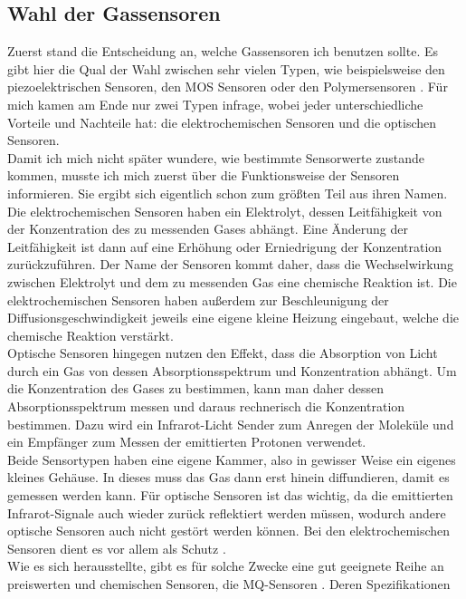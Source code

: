 \documentclass[10pt]{article}
\begin{document}
\subsection{Wahl der Gassensoren}
Zuerst stand die Entscheidung an, welche Gassensoren ich benutzen sollte. Es gibt hier die Qual der Wahl zwischen sehr vielen Typen,
wie beispielsweise den piezoelektrischen Sensoren, den MOS Sensoren oder den Polymersensoren \autocite{SensorTypes}.
Für mich kamen am Ende nur zwei Typen infrage, wobei jeder unterschiedliche Vorteile und Nachteile hat: 
die elektrochemischen Sensoren und die optischen Sensoren.\\
Damit ich mich nicht später wundere, wie bestimmte Sensorwerte zustande kommen, musste ich mich zuerst über
die Funktionsweise der Sensoren informieren. Sie ergibt sich eigentlich schon zum größten Teil aus ihren Namen. Die elektrochemischen Sensoren 
haben ein Elektrolyt, dessen Leitfähigkeit von der Konzentration des zu messenden Gases abhängt. Eine Änderung
der Leitfähigkeit ist dann auf eine Erhöhung oder Erniedrigung der Konzentration zurückzuführen. Der Name der Sensoren kommt daher,
dass die Wechselwirkung zwischen Elektrolyt und dem zu messenden Gas eine chemische Reaktion ist. Die elektrochemischen Sensoren 
haben außerdem zur Beschleunigung der Diffusionsgeschwindigkeit jeweils eine eigene kleine Heizung eingebaut, welche die chemische Reaktion verstärkt.\\
Optische Sensoren hingegen nutzen den Effekt, dass die Absorption von Licht durch ein Gas von dessen Absorptionsspektrum und Konzentration abhängt. 
Um die Konzentration des Gases zu bestimmen, kann man daher dessen Absorptionsspektrum messen und daraus rechnerisch die Konzentration bestimmen.
Dazu wird ein Infrarot-Licht Sender zum Anregen der Moleküle und ein Empfänger zum Messen der emittierten Protonen verwendet.\\
Beide Sensortypen haben eine eigene Kammer, also in gewisser Weise ein eigenes kleines Gehäuse. In dieses muss das Gas dann erst hinein
diffundieren, damit es gemessen werden kann. Für optische Sensoren ist das wichtig, da die emittierten Infrarot-Signale auch wieder zurück reflektiert werden müssen,
wodurch andere optische Sensoren auch nicht gestört werden können. Bei den elektrochemischen Sensoren dient es vor allem als Schutz \autocite{SensorTypes}.\\
Wie es sich herausstellte, gibt es für solche Zwecke eine gut geeignete Reihe an preiswerten und chemischen Sensoren, die MQ-Sensoren \autocite{MQSensoren}. Deren Spezifikationen 
\end{document}
